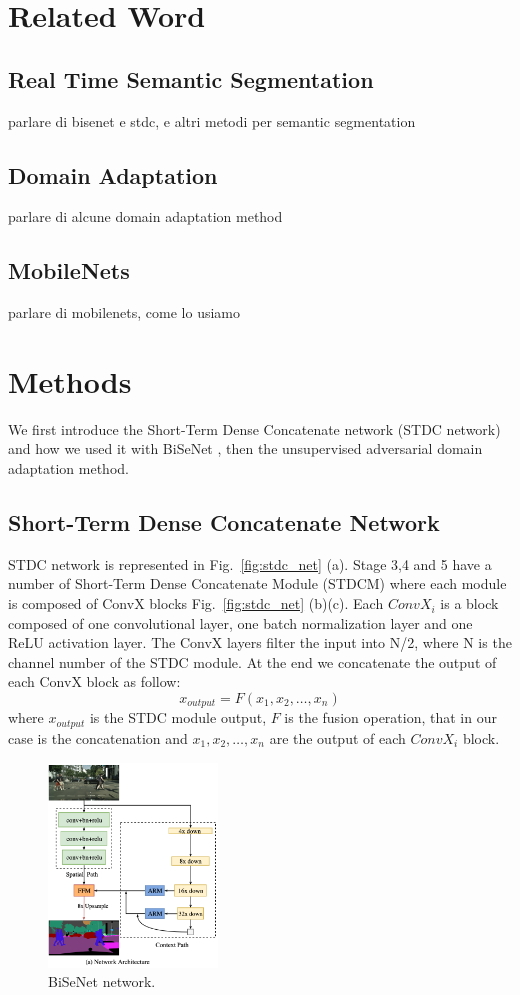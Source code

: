 \documentclass[conference]{IEEEtran}
\begin{document}
\section{Related Word}

\subsection{Real Time Semantic Segmentation}
parlare di bisenet e stdc, e altri metodi per semantic segmentation
\subsection{Domain Adaptation}
parlare di alcune domain adaptation method
\subsection{MobileNets}
parlare di mobilenets, come lo usiamo 
\section{Methods}

We first introduce the Short-Term Dense Concatenate network (STDC network) and how we used it with BiSeNet \cite{b2},
then the unsupervised adversarial domain adaptation method.

\subsection{Short-Term Dense Concatenate Network}

STDC network \cite{b1} is represented in Fig.~\ref{fig:stdc_net} (a). Stage 3,4 and 5 have a number of Short-Term Dense Concatenate Module (STDCM)
where each module is composed of ConvX blocks Fig.~\ref{fig:stdc_net} (b)(c). Each \(ConvX_i\) is a block composed of one convolutional layer,
one batch normalization layer and one ReLU activation layer. The ConvX layers filter the input into N/2, where N is the channel number
of the STDC module. At the end we concatenate the output of each ConvX block as follow: 
\[x_{output} = F(x_1,x_2,\dots,x_n)\]
where \(x_{output}\) is the STDC module output, \(F\) is the fusion operation, that in our case is the concatenation and \(x_1,x_2,
\dots,x_n\) are the output of each \(ConvX_i\) block.

\begin{figure}[tp]
\centerline{\includegraphics[width=0.4\textwidth]{figures/BiSeNet.pdf.png}}
\caption{BiSeNet network.}
\label{fig:bisenet}
\end{figure}
\end{document}
